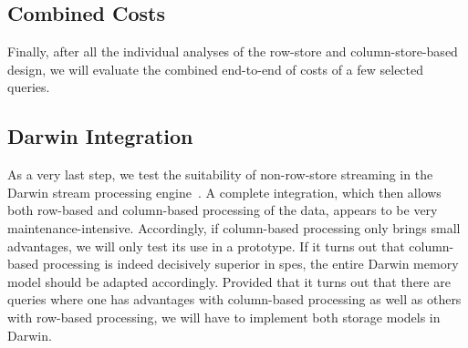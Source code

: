 \subsection{Combined Costs}

Finally, after all the individual analyses of the row-store and column-store-based design, we will evaluate the combined end-to-end of costs of a few selected queries.

\subsection{Darwin Integration}

As a very last step, we test the suitability of non-row-store streaming in the Darwin stream processing engine~\cite[]{DBLP:conf/cidr/BensonR22}.
A complete integration, which then allows both row-based and column-based processing of the data, appears to be very maintenance-intensive.
Accordingly, if column-based processing only brings small advantages, we will only test its use in a prototype.
If it turns out that column-based processing is indeed decisively superior in \acp{spe}, the entire Darwin memory model should be adapted accordingly.
Provided that it turns out that there are queries where one has advantages with column-based processing as well as others with row-based processing, we will have to implement both storage models in Darwin.